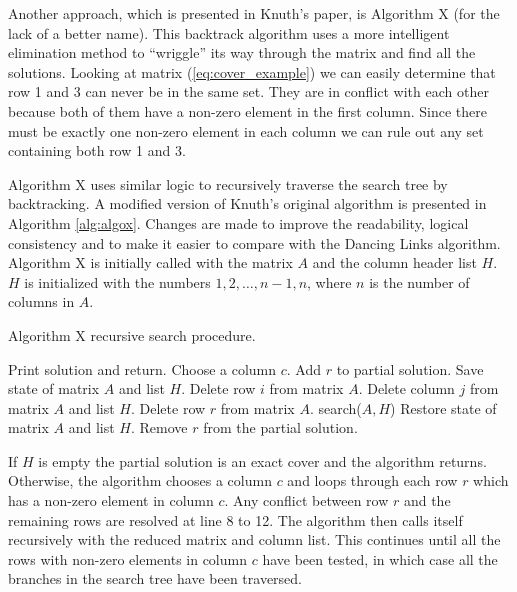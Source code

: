 Another approach, which is presented in Knuth's paper, is Algorithm X (for the lack of a better name).
This backtrack algorithm uses a more intelligent elimination method to ``wriggle'' its way through the matrix and find all the solutions.
Looking at matrix (\ref{eq:cover_example}) we can easily determine that row 1 and 3 can never be in the same set.
They are in conflict with each other because both of them have a non-zero element in the first column.
Since there must be exactly one non-zero element in each column we can rule out any set containing both row 1 and 3.

Algorithm X uses similar logic to recursively traverse the search tree by backtracking.
A modified version of Knuth's original algorithm is presented in Algorithm \ref{alg:algox}.
Changes are made to improve the readability, logical consistency and to make it easier to compare with the Dancing Links algorithm.
Algorithm X is initially called with the matrix $A$ and the column header list $H$.
$H$ is initialized with the numbers $1, 2, \ldots, n-1, n$, where $n$ is the number of columns in $A$.

\begin{algorithm}[htbp]
	\caption{Algorithm X recursive search procedure.}
	\label{alg:algox}
	\begin{distribalgo}[1]
				\STATE Print solution and return.  
			\ENDIF
			\STATE Choose a column $c$.
				\STATE Add $r$ to partial solution.
				\STATE Save state of matrix $A$ and list $H$.
						\STATE Delete row $i$ from matrix $A$.
					\ENDFOR
					\STATE Delete column $j$ from matrix $A$ and list $H$.
				\ENDFOR
				\STATE Delete row $r$ from matrix $A$.
				\STATE search($A,H$)
				\STATE Restore state of matrix $A$ and list $H$.
				\STATE Remove $r$ from the partial solution.
			\ENDFOR
		\ENDPROC
	\end{distribalgo}
\end{algorithm}

If $H$ is empty the partial solution is an exact cover and the algorithm returns.
Otherwise, the algorithm chooses a column $c$ and loops through each row $r$ which has a non-zero element in column $c$.
Any conflict between row $r$ and the remaining rows are resolved at line 8 to 12.
The algorithm then calls itself recursively with the reduced matrix and column list.
This continues until all the rows with non-zero elements in column $c$ have been tested, in which case all the branches in the search tree have been traversed.

